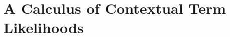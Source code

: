 \newcommand{\termCalcSec}{A Calculus of Contextual Term Likelihoods}
\section{\protect\termCalcSec}
\label{sec:term-calculus}
